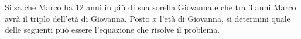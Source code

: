 Si sa che Marco ha 12 anni in più di sua sorella Giovanna 
e che tra 3 anni Marco avrà il triplo dell'età di Giovanna. 
Posto $x$ l'età di Giovanna, si determini quale delle seguenti 
può essere l'equazione che risolve il problema.
